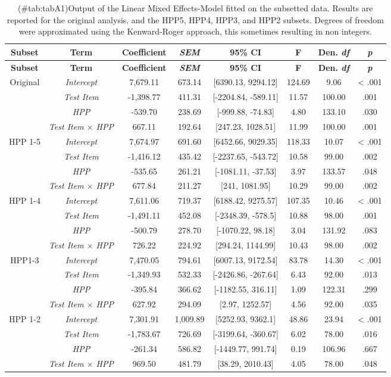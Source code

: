 \begin{appendix}
\begin{longtable}[]{@{}cccccccc@{}}
\caption{(\#tab:tabA1)Output of the Linear Mixed Effects-Model fitted on
the subsetted data. Results are reported for the original analysis, and
the HPP5, HPP4, HPP3, and HPP2 subsets. Degrees of freedom were
approximated using the Kenward-Roger approach, this sometimes resulting
in non integers.}\tabularnewline
\toprule
\textbf{Subset} & \textbf{Term} & \textbf{Coefficient} &
\textbf{\emph{SEM}} & \textbf{95\% CI} & \textbf{F} & \textbf{Den.
\emph{df}} & \textbf{\emph{p}}\tabularnewline
\midrule
\endfirsthead
\toprule
\textbf{Subset} & \textbf{Term} & \textbf{Coefficient} &
\textbf{\emph{SEM}} & \textbf{95\% CI} & \textbf{F} & \textbf{Den.
\emph{df}} & \textbf{\emph{p}}\tabularnewline
\midrule
\endhead
Original & \emph{Intercept} & 7,679.11 & 673.14 & {[}6390.13, 9294.12{]}
& 124.69 & 9.06 & \textless{} .001\tabularnewline
& \emph{Test Item} & -1,398.77 & 411.31 & {[}-2204.84, -589.11{]} &
11.57 & 100.00 & .001\tabularnewline
& \emph{HPP} & -539.70 & 238.69 & {[}-999.88, -74.83{]} & 4.80 & 133.10
& .030\tabularnewline
& \emph{Test Item \(\times\) HPP} & 667.11 & 192.64 & {[}247.23,
1028.51{]} & 11.99 & 100.00 & .001\tabularnewline
HPP 1-5 & \emph{Intercept} & 7,674.97 & 691.60 & {[}6452.66, 9029.35{]}
& 118.33 & 10.07 & \textless{} .001\tabularnewline
& \emph{Test Item} & -1,416.12 & 435.42 & {[}-2237.65, -543.72{]} &
10.58 & 99.00 & .002\tabularnewline
& \emph{HPP} & -535.65 & 261.21 & {[}-1081.11, -37.53{]} & 3.97 & 133.57
& .048\tabularnewline
& \emph{Test Item \(\times\) HPP} & 677.84 & 211.27 & {[}241, 1081.95{]}
& 10.29 & 99.00 & .002\tabularnewline
HPP 1-4 & \emph{Intercept} & 7,611.06 & 719.37 & {[}6188.42, 9275.57{]}
& 107.35 & 10.46 & \textless{} .001\tabularnewline
& \emph{Test Item} & -1,491.11 & 452.08 & {[}-2348.39, -578.5{]} & 10.88
& 98.00 & .001\tabularnewline
& \emph{HPP} & -500.79 & 278.70 & {[}-1070.22, 98.18{]} & 3.04 & 131.92
& .083\tabularnewline
& \emph{Test Item \(\times\) HPP} & 726.22 & 224.92 & {[}294.24,
1144.99{]} & 10.43 & 98.00 & .002\tabularnewline
HPP1-3 & \emph{Intercept} & 7,470.05 & 794.61 & {[}6007.13, 9172.54{]} &
83.78 & 14.30 & \textless{} .001\tabularnewline
& \emph{Test Item} & -1,349.93 & 532.33 & {[}-2426.86, -267.64{]} & 6.43
& 92.00 & .013\tabularnewline
& \emph{HPP} & -395.84 & 366.62 & {[}-1182.55, 316.11{]} & 1.09 & 122.31
& .299\tabularnewline
& \emph{Test Item \(\times\) HPP} & 627.92 & 294.09 & {[}2.97,
1252.57{]} & 4.56 & 92.00 & .035\tabularnewline
HPP 1-2 & \emph{Intercept} & 7,301.91 & 1,009.89 & {[}5252.93, 9362.1{]}
& 48.86 & 23.94 & \textless{} .001\tabularnewline
& \emph{Test Item} & -1,783.67 & 726.69 & {[}-3199.64, -360.67{]} & 6.02
& 78.00 & .016\tabularnewline
& \emph{HPP} & -261.34 & 586.82 & {[}-1449.77, 991.74{]} & 0.19 & 106.96
& .667\tabularnewline
& \emph{Test Item \(\times\) HPP} & 969.50 & 481.79 & {[}38.29,
2010.43{]} & 4.05 & 78.00 & .048\tabularnewline
\bottomrule
\end{longtable}


\end{appendix}

